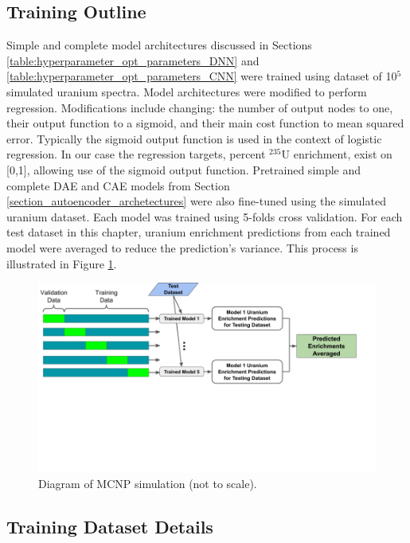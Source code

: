 
\subsection{Training Outline}

Simple and complete model architectures discussed in Sections \ref{table:hyperparameter_opt_parameters_DNN} and \ref{table:hyperparameter_opt_parameters_CNN} were trained using dataset of 10$^{5}$ simulated uranium spectra. Model architectures were modified to perform regression. Modifications include changing: the number of output nodes to one, their output function to a sigmoid, and their main cost function to mean squared error. Typically the sigmoid output function is used in the context of logistic regression. In our case the regression targets, percent $^{235}$U enrichment, exist on [0,1], allowing use of the sigmoid output function. Pretrained simple and complete DAE and CAE models from Section \ref{section_autoencoder_archetectures} were also fine-tuned using the simulated uranium dataset. Each model was trained using 5-folds cross validation. For each test dataset in this chapter, uranium enrichment predictions from each trained model were averaged to reduce the prediction's variance. This process is illustrated in Figure \ref{fig:uenrich_training_outline}.

\begin{figure}[H]
	\centering
	\includegraphics[trim=0 250 40 0,clip,width=1.0\linewidth]{images/uenrich_training_outline}
	\caption{Diagram of MCNP simulation (not to scale).}
	\label{fig:uenrich_training_outline}
\end{figure}

\subsection{Training Dataset Details}

